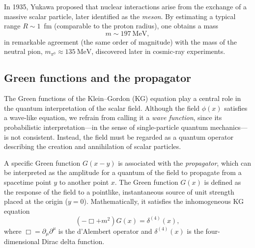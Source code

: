 In 1935, Yukawa proposed that nuclear interactions arise from the exchange of a massive scalar particle, later identified as the \textit{meson}.
By estimating a typical range $R \sim 1$~fm (comparable to the proton radius), one obtains a mass
\[
    m \sim 197~\text{MeV},
\]
in remarkable agreement (the same order of magnitude) with the mass of the neutral pion, $m_{\pi^0} \approx 135~\text{MeV}$, discovered later in cosmic-ray experiments.

\subsection{Green functions and the propagator}

The Green functions of the Klein--Gordon (KG) equation play a central role in the quantum interpretation of the scalar field.
Although the field \(\phi(x)\) satisfies a wave-like equation, we refrain from calling it a \textit{wave function}, since its probabilistic interpretation---in the sense of single-particle quantum mechanics---is not consistent. Instead, the field must be regarded as a quantum operator describing the creation and annihilation of scalar particles.

A specific Green function \(G(x - y)\) is associated with the \textit{propagator}, which can be interpreted as the amplitude for a quantum of the field to propagate from a spacetime point \(y\) to another point \(x\).
The Green function \(G(x)\) is defined as the response of the field to a pointlike, instantaneous source of unit strength placed at the origin (\(y = 0\)). Mathematically, it satisfies the inhomogeneous KG equation
\begin{equation}
    (-\Box + m^2) G(x) = \delta^{(4)}(x),
    \label{eq:GF_def}
\end{equation}
where \(\Box = \partial_\mu \partial^\mu\) is the d’Alembert operator and \(\delta^{(4)}(x)\) is the four-dimensional Dirac delta function.

